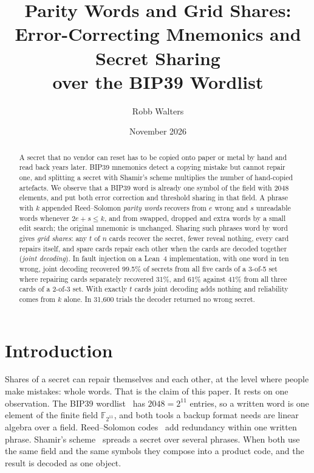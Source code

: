 \documentclass[numeric]{anvil-paper}
\title{Parity Words and Grid Shares:\\ Error-Correcting Mnemonics and Secret Sharing\\ over the BIP39 Wordlist}
\author{Robb Walters}
\date{November 2026}
\newcommand{\F}{\mathbb{F}}
\begin{document}
\maketitle

\begin{abstract}
A secret that no vendor can reset has to be copied onto paper or metal by hand
and read back years later. BIP39 mnemonics detect a copying mistake but cannot
repair one, and splitting a secret with Shamir's scheme multiplies the number of
hand-copied artefacts. We observe that a BIP39 word is already one symbol of the
field with 2048 elements, and put both error correction and threshold sharing
in that field. A phrase with $k$ appended Reed--Solomon \emph{parity words}
recovers from $e$ wrong and $s$ unreadable words whenever $2e+s\le k$, and from
swapped, dropped and extra words by a small edit search; the original mnemonic
is unchanged. Sharing such phrases word by word gives \emph{grid shares}: any
$t$ of $n$ cards recover the secret, fewer reveal nothing, every card repairs
itself, and spare cards repair each other when the cards are decoded together
(\emph{joint decoding}). In fault injection on a Lean~4
implementation, with one word in ten wrong, joint decoding recovered 99.5\% of
secrets from all five cards of a 3-of-5 set where repairing cards separately
recovered 31\%, and 61\% against 41\% from all three cards of a 2-of-3 set.
With exactly $t$ cards joint decoding adds nothing and reliability comes from
$k$ alone. In 31{,}600 trials the decoder returned no wrong secret.
\end{abstract}

\section{Introduction}
\label{sec:intro}

Shares of a secret can repair themselves and each other, at the level where
people make mistakes: whole words. That is the claim of this paper. It rests on
one observation. The BIP39 wordlist~\citep{bip39} has $2048 = 2^{11}$ entries,
so a written word is one element of the finite field $\F_{2^{11}}$, and both
tools a backup format needs are linear algebra over a field. Reed--Solomon
codes~\citep{reed1960polynomial} add redundancy within one written phrase.
Shamir's scheme~\citep{shamir1979how} spreads a secret over several phrases.
When both use the same field and the same symbols they compose into a product
code, and the result is decoded as one object.
\end{document}
